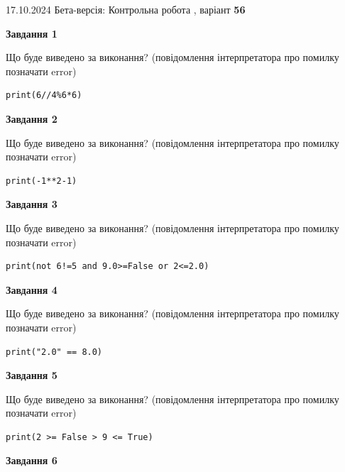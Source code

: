 \documentclass[12pt, ukrainian]{article}
\begin{document}
{\Large{17.10.2024 Бета-версія: Контрольна робота , варіант  \No \textbf { 56 }\par}}
{
\begin {large}
{\begin {center}\textbf{Завдання 1}\end {center}}

Що буде виведено за виконання? (повідомлення інтерпретатора про помилку позначати error)\par
\begin{verbatim}
print(6//4%6*6)
\end{verbatim}

{\begin {center}\textbf{Завдання 2}\end {center}}

Що буде виведено за виконання? (повідомлення інтерпретатора про помилку позначати error)\par
\begin{verbatim}
print(-1**2-1)
\end{verbatim}

{\begin {center}\textbf{Завдання 3}\end {center}}

Що буде виведено за виконання? (повідомлення інтерпретатора про помилку позначати error)\par
\begin{verbatim}
print(not 6!=5 and 9.0>=False or 2<=2.0)
\end{verbatim}

{\begin {center}\textbf{Завдання 4}\end {center}}

Що буде виведено за виконання? (повідомлення інтерпретатора про помилку позначати error)\par
\begin{verbatim}
print("2.0" == 8.0)
\end{verbatim}

{\begin {center}\textbf{Завдання 5}\end {center}}

Що буде виведено за виконання? (повідомлення інтерпретатора про помилку позначати error)\par
\begin{verbatim}
print(2 >= False > 9 <= True)
\end{verbatim}

{\begin {center}\textbf{Завдання 6}\end {center}}


\end{large}}
\end{document}
